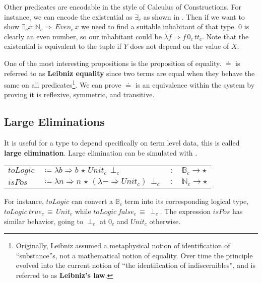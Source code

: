 Other predicates are encodable in the style of Calculus of Constructions\cite{10.1016/0890-5401(88)90005-3}.
For instance, we can encode the existential as $\exists_{c}$ as shown in .
Then if we want to show $\exists_{c}x:\mathbb{N}_{c}\Rightarrow\,Even_{c}\,x$ we need to find a suitable inhabitant of that type.
$0$ is clearly an even number, so our inhabitant could be $\lambda f\Rightarrow f\,0_{c}\,tt_{c}$.
Note that the existential is equivalent to the tuple if $Y$ does not depend on the value of $X$.

One of the most interesting propositions is the proposition of equality.
$\doteq$ is referred to as \textbf{Leibniz equality} since two terms are equal when they behave the same on all predicates\footnote{
  Originally, Leibniz assumed a metaphysical notion of identification of ``substance''s, not a mathematical notion of equality\cite[Section 9]{Leibniz1686}.
  Over time the principle evolved into the current notion of ``the identification of indiscernibles'', and is referred to as \textbf{Leibniz's law}.}.
We can prove $\doteq$ is an equivalence within the system by proving it is reflexive, symmetric, and transitive.

\subsection{Large Eliminations}


It is useful for a type to depend specifically on term level data, this is called \textbf{large elimination}.
Large elimination can be simulated with \tit{}.

\begin{tabular}{llll}
  $toLogic$ & $\coloneqq\lambda b\Rightarrow b\,\star\,Unit_{c}\,\perp_{c}$ & $:$ & $\mathbb{B}_{c}\rightarrow\star$\tabularnewline
  $isPos$ & $\coloneqq\lambda n\Rightarrow n\,\star\,(\lambda-\Rightarrow Unit_{c})\,\perp_{c}$ & $:$ & $\mathbb{N}_{c}\rightarrow\star$\tabularnewline
\end{tabular}
  
For instance, $toLogic$ can convert a $\mathbb{B}_{c}$ term into its corresponding logical type, $toLogic\ true_{c}\,\equiv\, Unit_{c}$ while $toLogic\ false_{c}\, \equiv\, \perp_{c}$.
The expression $isPos$ has similar behavior, going to $\perp_{c}$ at $0_{c}$ and $Unit_{c}$ otherwise.

